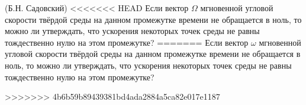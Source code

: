 (Б.Н. Садовский)
<<<<<<< HEAD
Если вектор $\Omega$ мгновенной угловой скорости твёрдой среды на данном
промежутке времени не обращается в ноль, то можно ли утверждать, что
ускорения некоторых точек среды не равны тождественно нулю на этом
промежутке?
=======
Если вектор $\omega$ мгновенной угловой скорости твёрдой среды на данном 
промежутке времени не обращается в ноль, то можно ли утверждать, что 
ускорения некоторых точек среды не равны тождественно нулю на этом 
промежутке?

>>>>>>> 4b6b59b89439381bd4ada2884a5ca82e017e1187
